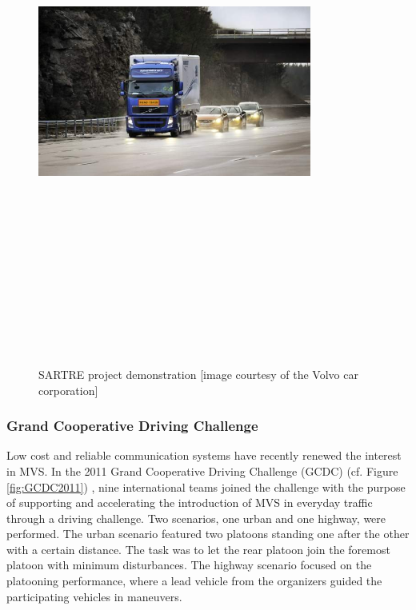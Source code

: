 \begin{figure}[!h]
        \centering 
        \includegraphics[width=9cm,height=18cm,keepaspectratio]{chapters/Chapitre_2/Figures/SARTRE.jpg}
        \caption{SARTRE project demonstration [image courtesy of the Volvo car corporation]}
        \label{fig:SARTRE}
        \end{figure}



\subsubsection{Grand Cooperative Driving Challenge} \label{sec:GCDC}
Low cost and reliable communication systems have recently renewed the interest in MVS. In the 2011 Grand Cooperative Driving Challenge (GCDC) (cf. Figure \ref{fig:GCDC2011}) \cite{bergenhem2010challenges}\cite{ploeg2012introduction}\cite{maartensson2012development}\cite{guvencc2012cooperative}, nine international teams joined the challenge with the purpose of supporting and accelerating the introduction of MVS in everyday traffic through a driving challenge. Two scenarios, one urban and one highway, were performed. The urban scenario featured two platoons standing one after the other with a certain distance. The task was to let the rear platoon join the foremost platoon with minimum disturbances. The highway scenario focused on the platooning performance, where a lead vehicle from the organizers guided the participating vehicles in maneuvers. 

